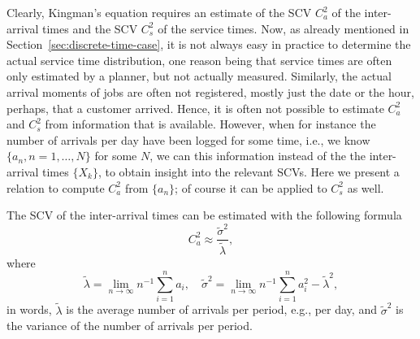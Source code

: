 Clearly, Kingman's equation requires an estimate of the SCV $C_a^2$ of
the inter-arrival times and the SCV $C_s^2$ of the service times. Now,
as already mentioned in Section~\ref{sec:discrete-time-case}, it is
not always easy in practice to determine the actual service time
distribution, one reason being that service times are often only
estimated by a planner, but not actually measured. Similarly, the
actual arrival moments of jobs are often not registered, mostly just
the date or the hour, perhaps, that a customer arrived.  Hence, it is
often not possible to estimate $C_a^2$ and $C_s^2$ from information
that is available.  However, when for instance the number of arrivals
per day have been logged for some time, i.e., we know
$\{a_n, n=1,\ldots, N\}$ for some $N$, we can this information instead
of the the inter-arrival times $\{X_k\}$, to obtain insight into the
relevant SCVs.  Here we present a relation to compute $C_a^2$ from
$\{a_n\}$; of course it can be applied to $C_s^2$ as well.

\begin{theorem} The SCV of the inter-arrival times can be estimated
  with the following formula
\begin{equation*}
C_a^2 \approx \frac{\tilde \sigma^2}{\tilde \lambda},
\end{equation*}
where 
\begin{equation*}
\tilde  \lambda = \lim_{n\to\infty} n^{-1} \sum_{i=1}^n a_i,\quad  
\tilde  \sigma^2 = \lim_{n\to\infty} n^{-1} \sum_{i=1}^n a_i^2 - \tilde \lambda^2,
\end{equation*}
in words, $\tilde \lambda$ is the average number of arrivals per
period, e.g., per day, and $\tilde \sigma^2 $ is the variance of the
number of arrivals per period.
\end{theorem}

